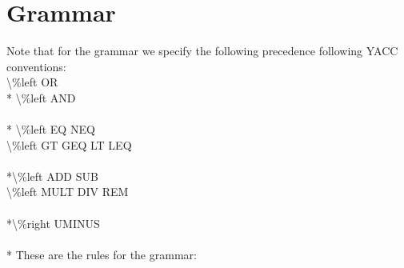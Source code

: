 \section{Grammar}
\newlength{}
\newlength{}
\newlength{}
\settowidth{}
\settowidth{}
\setlength{}
\addtolength{}
\addtolength{}
\addtolength{}
Note that for the grammar we specify the following precedence following YACC conventions:
\\ \textbackslash\%left OR
\\* \textbackslash\%left AND
\\ \\* \textbackslash\%left EQ NEQ
\\ \textbackslash\%left GT GEQ LT LEQ
\\ \\*\textbackslash\%left ADD SUB
\\ \textbackslash\%left MULT DIV REM
\\ \\*\textbackslash\%right UMINUS
\\ \\* These are the rules for the grammar:
